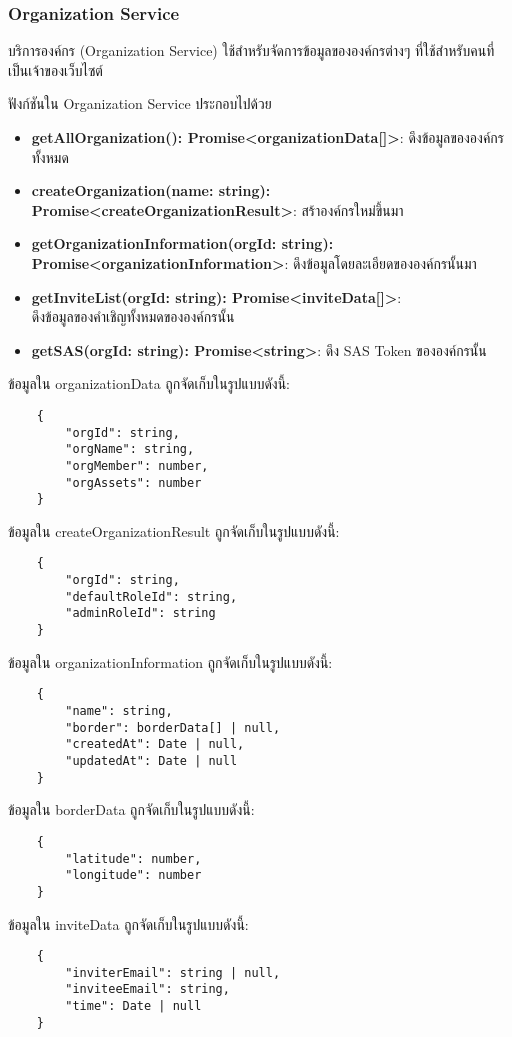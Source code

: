 \subsubsection{Organization Service}

\ifenglish
\else
บริการองค์กร (Organization Service) ใช้สำหรับจัดการข้อมูลขององค์กรต่างๆ ที่ใช้สำหรับคนที่เป็นเจ้าของเว็บไซต์

ฟังก์ชันใน Organization Service ประกอบไปด้วย

\begin{itemize}
    \item \textbf{getAllOrganization(): Promise<organizationData[]>}: ดึงข้อมูลขององค์กรทั้งหมด
    \item \textbf{createOrganization(name: string): Promise<createOrganizationResult>}: สร้าองค์กรใหม่ขึ้นมา
    \item \textbf{getOrganizationInformation(orgId: string): Promise<organizationInformation>}: ดึงข้อมูลโดยละเอียดขององค์กรนั้นมา
    \item \textbf{getInviteList(orgId: string): Promise<inviteData[]>}:\\ ดึงข้อมูลของคำเชิญทั้งหมดขององค์กรนั้น
    \item \textbf{getSAS(orgId: string): Promise<string>}: ดึง SAS Token ขององค์กรนั้น
\end{itemize}

ข้อมูลใน organizationData ถูกจัดเก็บในรูปแบบดังนี้:
\begin{lstlisting}
    {
        "orgId": string,
        "orgName": string,
        "orgMember": number,
        "orgAssets": number
    }
\end{lstlisting}

ข้อมูลใน createOrganizationResult ถูกจัดเก็บในรูปแบบดังนี้:
\begin{lstlisting}
    {
        "orgId": string,
        "defaultRoleId": string,
        "adminRoleId": string
    }
\end{lstlisting}

\clearpage

ข้อมูลใน organizationInformation ถูกจัดเก็บในรูปแบบดังนี้:
\begin{lstlisting}
    {
        "name": string,
        "border": borderData[] | null,
        "createdAt": Date | null,
        "updatedAt": Date | null
    }
\end{lstlisting}

ข้อมูลใน borderData ถูกจัดเก็บในรูปแบบดังนี้:
\begin{lstlisting}
    {
        "latitude": number,
        "longitude": number
    }
\end{lstlisting}

ข้อมูลใน inviteData ถูกจัดเก็บในรูปแบบดังนี้:
\begin{lstlisting}
    {
        "inviterEmail": string | null,
        "inviteeEmail": string,
        "time": Date | null
    }
\end{lstlisting}
\fi